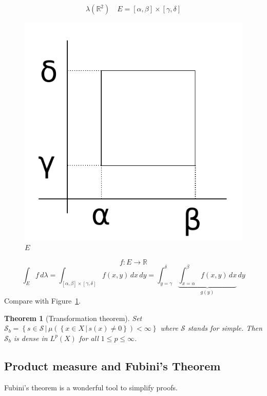 \documentclass{article}
\newtheorem{theorem}{Theorem}  \numberwithin{theorem}{section}
\newcommand{\setdef}[2]{\left\{\left.#1\,\right|\,#2\right\}}
\begin{document}
\[ \lambda(\mathbb R^2) \quad E = [\alpha, \beta] \times [\gamma, \delta] \]
\begin{figure}[!h]
  \begin{center}
    \includegraphics{img/19_E.pdf}
    \caption{$E$}
    \label{img:19E}
  \end{center}
\end{figure}
\[ f: E \to \mathbb R \]
\[ \int_E f \, d\lambda = \int_{[\alpha, \beta] \times [\gamma, \delta]} f(x,y) \, dx \, dy = \int_{y=\gamma}^{\delta} \underbrace{\int_{x=\alpha}^\beta f(x,y) \, dx}_{g(y)} \, dy \]
Compare with Figure~\ref{img:19E}.

\begin{theorem}[Transformation theorem] %
  Set $\mathcal S_b = \setdef{s \in \mathcal S}{\mu(\setdef{x \in X}{s(x) \neq 0}) < \infty}$ where $\mathcal S$ stands for \emph{simple}.
  Then $\mathcal S_b$ is dense in $L^p(X)$ for all $1 \leq p \leq \infty$.
\end{theorem}

\subsection{Product measure and Fubini's Theorem}
Fubini's theorem is a wonderful tool to simplify proofs.
\end{document}
